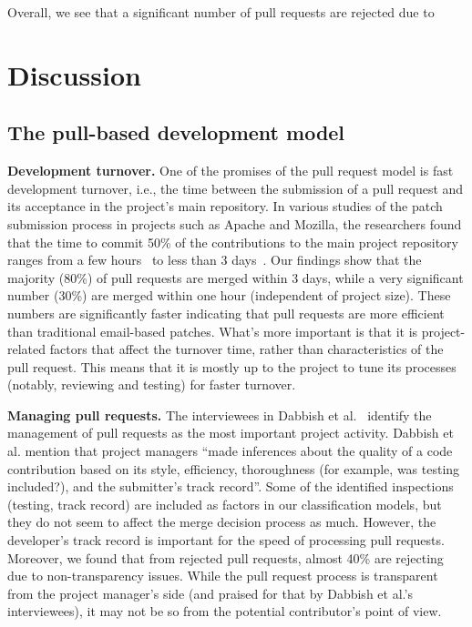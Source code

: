 \documentclass{sig-alternate}
\begin{document}
Overall, we see that a significant number of pull requests are rejected 
due to 

\section{Discussion}
\label{sec:discussion}

\subsection{The pull-based development model}

\textbf{Development turnover.} One of the promises of the pull request model
is fast development turnover, i.e., the time between the submission of a pull
request and its acceptance in the project's main repository. In various studies of
the patch submission process in projects such as Apache and Mozilla, the
researchers found that the time to commit 50\% of the contributions to the main
project repository ranges from a few hours~\cite{Rigby08} to less than 3
days~\cite{Weiss08, Baysa12}. Our findings show that the majority (80\%) of
pull requests are merged within 3 days, while a very significant number (30\%)
are merged within one hour (independent of project size). These numbers are significantly faster indicating
that pull requests are more efficient than traditional email-based patches.
What's more important is that it is project-related factors that affect the
turnover time, rather than characteristics of the pull request. This means that
it is mostly up to the project to tune its processes (notably, reviewing and
testing) for faster turnover.

\textbf{Managing pull requests.} The interviewees in Dabbish et
al.~\cite{Dabbi13} identify the management of pull requests as the most
important project activity. Dabbish et al. mention that project managers ``made
inferences about the quality of a code contribution based on its style,
efficiency, thoroughness (for example, was testing included?), and the
submitter's track record''. Some of the identified inspections (testing, track record) are included as factors in our classification models, but they do not
seem to affect the merge decision process as much. However, the developer's track record is important for the speed of processing pull requests. Moreover, 
we found that from rejected pull requests, almost 40\% are rejecting due to
non-transparency issues. While the pull request process is transparent from
the project manager's side (and praised for that by Dabbish et
al.'s interviewees), it may not be so from the potential contributor's point of
view.
\end{document}
